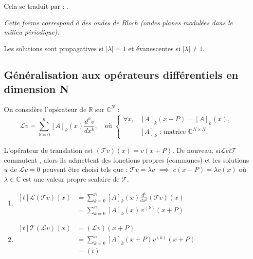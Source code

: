 \documentclass[12pt,a4paper]{article}
\begin{document}
	\begin{minipage}{8cm}
		Cela se traduit par : .
	\end{minipage}
	\begin{minipage}{8cm}
		\textit{Cette forme correspond à des ondes de Bloch (ondes planes modulées dans le milieu périodique).}
	\end{minipage}
	
	Les solutions sont propagatives si $|\lambda| = 1$ et évanescentes si $|\lambda| \not =  1$.
	
	\subsection{Généralisation aux opérateurs différentiels en dimension N}
	On considère l'opérateur de $\mathbb{R}$ sur $\mathbb{C}^N$ :
	\[
	\mathcal L v = \sum_{k = 0}^n [A]_k(x) \frac{d^k v}{dx^k}, \quad 
	\text{où } 
	\begin{cases}
		\forall x, & [A]_k(x+P) = [A]_k(x),\\
		& [A]_k \text{ : matrice } \mathbb{C}^{N\times N}.
	\end{cases}
	\]
	
	
	L'opérateur de translation est $\left(\mathcal T v\right)(x) = v(x+P)$. De nouveau, si$\mathcal L et \mathcal T$ commutent , alors ils admettent des fonctions propres (communes) et les solutions $u$ de $\mathcal L v = 0$ peuvent être choisi tels que : $\mathcal T v = \lambda v$ $\implies$ $c(x+P) = \lambda v(x)$ où $\lambda \in \mathbb{C}$ est une valeur propre scalaire de $\mathcal T$.
	\begin{enumerate}
		\item[$(i)$] $\begin{aligned}[t]
			\mathcal L\left(\mathcal T v\right)(x) 
			&= \sum_{k=0}^n [A]_k(x) \frac{d^k}{dx^k}\left(\mathcal T v\right)(x)\\
			&= \sum_{k=0}^n [A]_k(x) \, v^{(k)}(x+P)
		\end{aligned}$\\
		
		\item[$(ii)$] $\begin{aligned}[t]
			\mathcal T\left(\mathcal L v\right)(x) 
			&= \left(\mathcal L v\right)(x+P)\\
			&= \displaystyle\sum_{k=0}^n [A]_k(x+P)v^{(k)}(x+P)\\
			&= (i)
		\end{aligned}$
	\end{enumerate}
	
\end{document}
